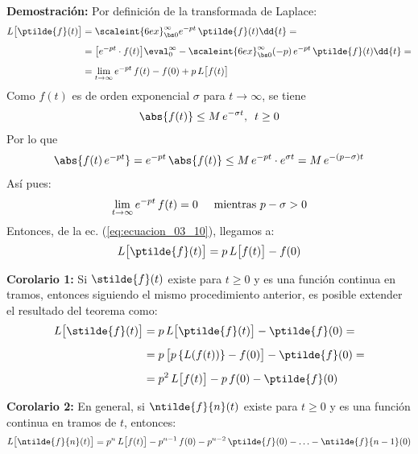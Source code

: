 \noindent \textbf{Demostración:} Por definición de la transformada de Laplace:
\begin{align}
\begin{aligned}[b]
L \big[\ptilde{f}(t)\big] &= \scaleint{6ex}_{\bs 0}^{\infty} e^{-p t} \, \ptilde{f} (t) \dd{t} = \\[0.5em]
&= \big[e^{-p t} \cdot f(t)\big] \eval_{0}^{\infty} - \scaleint{6ex}_{\bs 0}^{\infty} (-p) \, e^{-p t} \, \ptilde{f} (t) \dd{t} = \\[0.5em]
&= \lim_{t \to \infty} e^{-p t} \, f(t) - f(0) + p \, L \big[f(t)\big]
\end{aligned}
\label{eq:ecuacion_03_10}
\end{align}
Como $f(t)$ es de orden exponencial $\sigma$ para $t \to \infty$, se tiene
\begin{align*}
\abs{f(t)} \leq M \, e^{-\sigma t}, \hspace{0.5em} t \geq 0
\end{align*}
Por lo que
\begin{align*}
\abs{f(t) \, e^{-p t}} = e^{-p t} \, \abs{f(t)} \leq M \, e^{-p t} \cdot e^{\sigma t} = M \, e^{-(p - \sigma) t}
\end{align*}
Así pues:
\begin{align*}
\lim_{t \to \infty} e^{-p t} \, f(t) = 0 \hspace{0.5cm} \mbox{mientras  } p - \sigma > 0
\end{align*}
Entonces, de la ec. (\ref{eq:ecuacion_03_10}), llegamos a:
\begin{align}
L \big[\ptilde{f}(t)\big] = p \, L \big[f(t)\big] - f(0)
\label{eq:ecuacion_03_11}
\end{align}

\noindent \textbf{Corolario 1: } Si $\stilde{f}(t)$ existe para $t \geq 0$ y es una función continua en tramos, entonces siguiendo el mismo procedimiento anterior, es posible extender el resultado del teorema como:
\begin{align}
\begin{aligned}[b]
L \big[\stilde{f}(t)\big] &= p \, L \big[\ptilde{f}(t)\big] - \ptilde{f}(0) = \\[0.5em]
&= p \, \big[p \left\{ L (f(t)) \right\} - f(0) \big] - \ptilde{f} (0) = \\[0.5em]
&= p^{2} \, L \big[f(t)\big] - p \, f(0) - \ptilde{f}(0)
\end{aligned}
\label{eq:ecuacion_03_12}
\end{align}

\noindent \textbf{Corolario 2:} En general, si $\ntilde{f}{n}(t)$ existe para $t \geq 0$ y es una función continua en tramos de $t$, entonces:
\begin{align}
L \big[\ntilde{f}{n}(t)\big] = p^{n} \, L \big[f(t)\big] - p^{n-1} \, f(0) - p^{n-2} \, \ptilde{f}(0) - \ldots - \ntilde{f}{n-1} (0)
\label{eq:ecuacion_03_13}
\end{align}

